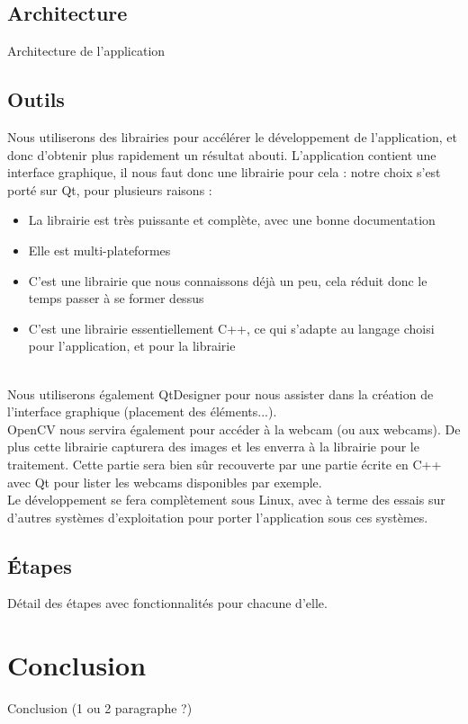 \documentclass{article}
\begin{document}
		\subsection{Architecture}
			Architecture de l'application
		\subsection{Outils}
			Nous utiliserons des librairies pour accélérer le développement de l'application, et donc d'obtenir plus 
rapidement un résultat abouti.
		L'application contient une interface graphique, il nous faut donc une librairie pour cela :
		notre choix s'est porté sur Qt, pour plusieurs raisons : 
		\begin{itemize}
		\item La librairie est très puissante et complète, avec une bonne documentation
		\item Elle est multi-plateformes
		\item C'est une librairie que nous connaissons déjà un peu, cela réduit donc le temps passer à se former dessus
		\item C'est une librairie essentiellement C++, ce qui s'adapte au langage choisi pour l'application, et pour la librairie
		\end{itemize} \ \\
Nous utiliserons également QtDesigner pour nous assister dans la création de l'interface graphique (placement des éléments...). \\
		
OpenCV nous servira également pour accéder à la webcam (ou aux webcams). De plus cette librairie capturera des images et les enverra à la librairie pour le traitement. Cette partie sera bien sûr recouverte par une partie écrite en C++ avec Qt pour lister les webcams disponibles par exemple. \\

		Le développement se fera complètement sous Linux, avec à terme des essais sur d'autres systèmes d'exploitation pour
porter l'application sous ces systèmes. \\ 

		\subsection{Étapes}
			Détail des étapes avec fonctionnalités pour chacune d'elle.
	\section{Conclusion}	
		Conclusion (1 ou 2 paragraphe ?)
	
\end{document}
